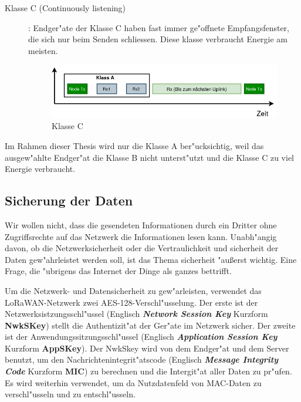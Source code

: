 \begin{description}
	\vspace{10cm}
	\item [Klasse C (Continuously listening)]: Endger"ate der Klasse C 
	haben fast immer ge"offnete Empfangsfenster, die sich nur beim 
	Senden schliessen. Diese klasse verbraucht Energie am meisten.
	
	\begin{figure}[h]
		\centering
		\includegraphics[width=13cm]{source/images/ClassC}
		\caption{Klasse C \label{fig:classC}}
	\end{figure}

\end{description}


Im Rahmen dieser Thesis wird nur die Klasse A ber"ucksichtig, weil das 
ausgew"ahlte Endger"at die Klasse B nicht unterst"utzt und die Klasse C 
zu viel Energie verbraucht. 

\subsection{Sicherung der Daten}\label{secure}

Wir wollen nicht, dass die gesendeten Informationen durch ein Dritter 
ohne Zugriffsrechte auf das Netzwerk die Informationen lesen kann. 
Unabh"angig davon, ob die Netzwerksicherheit oder die Vertraulichkeit 
und sicherheit der Daten gew"ahrleistet werden soll, ist das Thema 
sicherheit "au\ss{}erst wichtig. Eine Frage, die "ubrigens das Internet 
der Dinge als ganzes bettrifft.

Um die Netzwerk- und Datensicherheit zu gew"arleisten, verwendet das 
LoRaWAN-Netzwerk zwei AES-128-Verschl"usselung. Der erste ist der 
Netzwerksistzungsschl"ussel (Englisch \textbf{\textit{Network Session 
Key}} Kurzform \textbf{NwkSKey}) stellt die Authentizit"at der Ger"ate 
im Netzwerk sicher. Der zweite ist der Anwendungssitzungsschl"ussel
(Englisch \textbf{\textit{Application Session Key}} Kurzform 
\textbf{AppSKey}). Der NwkSkey wird von dem Endger"at und dem Server 
benutzt, um den Nachrichtenintegrit"atscode (Englisch 
\textbf{\textit{Message Integrity Code}} Kurzform \textbf{MIC}) zu 
berechnen und die Intergit"at aller Daten zu pr"ufen.  Es wird weiterhin 
verwendet, um da  Nutzdatenfeld von MAC-Daten zu verschl"usseln und zu 
entschl"usseln. 

